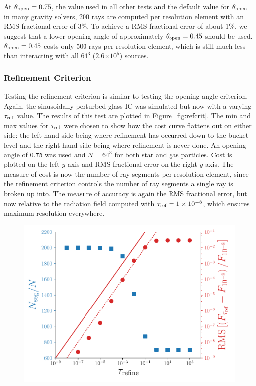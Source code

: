 \documentclass[fleq,usenatbib]{mnras}
\providecommand{\e}[1]{\ensuremath{\times10^{#1}}}
\newcommand{\tr}{\tau_{\rm ref}}
\newcommand{\tO}{\theta_{\rm open}}
\begin{document}
{At $\tO=0.75$, the value used in all other tests and the 
default value for $\tO$ in many gravity solvers, 200 rays are 
computed per resolution element with an RMS fractional error of 3\%. To 
achieve a RMS fractional error of about 1\%, we suggest that a lower opening 
angle of approximately $\tO=0.45$ should be used. $\tO=0.45$ costs only 500 
rays per resolution element, which is still much less than interacting with 
all $64^3$ ($2.6\e{5}$) sources.

\subsubsection{Refinement Criterion}
Testing the refinement criterion is similar to testing the opening angle 
criterion. Again, the sinusoidally perturbed glass IC was simulated but now 
with a varying $\tr$ value. The results of this test are plotted in 
Figure~\ref{fig:refcrit}. The min and max values for $\tr$ were chosen
to show how the cost curve flattens out on either side: the left hand side being 
where refinement has occurred down to the bucket level and the right hand side 
being where refinement is never done. An opening angle of 0.75 was used and 
$N=64^3$ for both star and gas particles. Cost is plotted on the left $y$-axis 
and RMS fractional error on the right $y$-axis. The measure of cost is now 
the number of ray segments per resolution element, since the refinement 
criterion controls the number of ray segments a single ray is broken up into. 
The measure of accuracy is again the RMS fractional error, but now relative to 
the radiation field computed with $\tr=1\e{-8}$, which ensures maximum
resolution everywhere.
\begin{figure}
\includegraphics[width=1\linewidth]{Figures/refinement_criteria.pdf}

\end{figure}}
\end{document}
